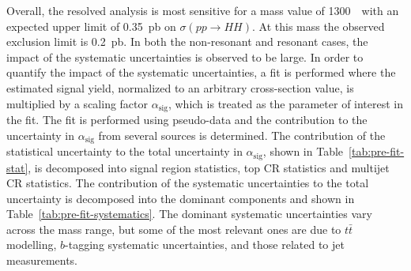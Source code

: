  
Overall, the resolved analysis is most sensitive for a mass value of 1300~\GeV\ with an
expected upper limit of 0.35~pb on $\sigma(pp \to HH)$. At this mass the observed exclusion limit  is 0.2~pb.
In both the non-resonant and resonant cases, the impact of the
systematic uncertainties is observed to be large.
In order to quantify the impact of the
systematic uncertainties, a fit is performed where the estimated
signal yield,  normalized to an arbitrary cross-section value, is multiplied
by a scaling factor $\alpha_{\mathrm{sig}}$, which is treated as
the parameter of interest in the fit.
The fit is performed using pseudo-data and the contribution to the  uncertainty in
$\alpha_{\mathrm{sig}}$ from several sources is determined. The contribution of the statistical uncertainty  to the total
uncertainty in $\alpha_{\mathrm{sig}}$, shown in Table~\ref{tab:pre-fit-stat},  is decomposed into
signal region statistics, top CR statistics and multijet CR
statistics. The contribution of the systematic uncertainties to the
total uncertainty is decomposed into the dominant components and shown in Table~\ref{tab:pre-fit-systematics}. The dominant
systematic uncertainties vary across the mass range, but some of the most relevant ones are due to $t \bar{t}$ modelling, $b$-tagging systematic uncertainties, and those related to jet measurements.
 
